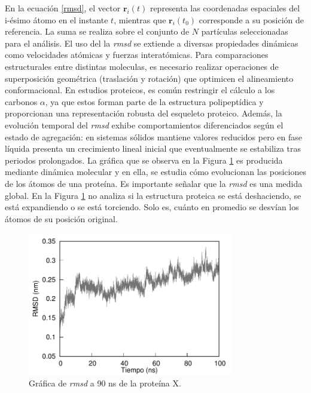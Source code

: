En la ecuaci\'{o}n \ref{rmsd}, el vector \(\mathbf{r}_i(t)\) representa las coordenadas espaciales del i-\'{e}simo \'{a}tomo en el instante $t$, mientras que \(\mathbf{r}_i(t_0)\) corresponde a su posici\'{o}n de referencia. La suma se realiza sobre el conjunto de $N$ part\'{i}culas seleccionadas para el an\'{a}lisis. El uso del la \textit{rmsd} se extiende a diversas propiedades din\'{a}micas como velocidades at\'{o}micas y fuerzas interat\'{o}micas. Para comparaciones estructurales entre distintas moleculas, es necesario realizar operaciones de superposici\'{o}n geom\'{e}trica (traslaci\'{o}n y rotaci\'{o}n) que optimicen el alineamiento conformacional. En estudios proteicos, es com\'{u}n restringir el c\'{a}lculo a los carbonos $\alpha$, ya que estos forman parte de la estructura polipept\'{i}dica y proporcionan una representaci\'{o}n robusta del esqueleto proteico. Además, la evoluci\'{o}n temporal del \textit{rmsd} exhibe comportamientos diferenciados seg\'{u}n el estado de agregaci\'{o}n: en sistemas s\'{o}lidos mantiene valores reducidos pero en fase l\'{i}quida presenta un crecimiento lineal inicial que eventualmente se estabiliza tras periodos prolongados. La gr\'{a}ﬁca que se observa en la Figura \ref{rmsd-graf} es producida mediante din\'{a}mica molecular y en ella, se estudia c\'{o}mo evolucionan las posiciones de los \'{a}tomos de una prote\'{i}na. Es importante señalar que la \textit{rmsd} es una medida  global. En la Figura \ref{rmsd-graf} no analiza si la estructura proteica se est\'{a} deshaciendo, se est\'{a} expandiendo o se est\'{a} torciendo. Solo es, cu\'{a}nto en promedio se desv\'{i}an los \'{a}tomos de su posici\'{o}n original.

	\begin{figure}[h!]
		\centering
		\includegraphics[width=0.8\textwidth]{graphs/rmsd.pdf}
	\caption{Gr\'{a}fica de \textit{rmsd} a 90 ns de la prote\'{i}na X.}
	\label{rmsd-graf}
	\end{figure}


